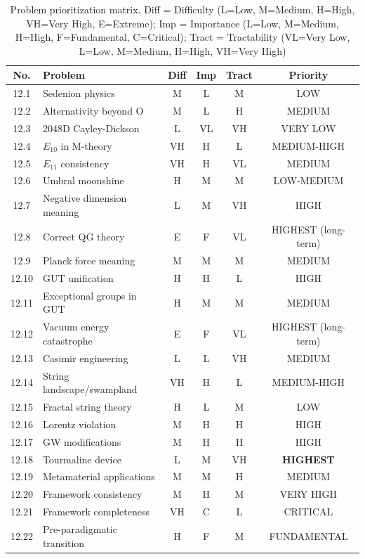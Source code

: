 \begin{table}[h]
\centering
\small
\begin{tabular}{clcccc}
\toprule
\textbf{No.} & \textbf{Problem} & \textbf{Diff} & \textbf{Imp} & \textbf{Tract} & \textbf{Priority} \\
\midrule
12.1  & Sedenion physics              & M  & L & M  & LOW \\
12.2  & Alternativity beyond O        & M  & L & H  & MEDIUM \\
12.3  & 2048D Cayley-Dickson          & L  & VL & VH & VERY LOW \\
12.4  & $E_{10}$ in M-theory          & VH & H & L  & MEDIUM-HIGH \\
12.5  & $E_{11}$ consistency          & VH & H & VL & MEDIUM \\
12.6  & Umbral moonshine              & H  & M & M  & LOW-MEDIUM \\
12.7  & Negative dimension meaning    & L  & M & VH & HIGH \\
12.8  & Correct QG theory             & E  & F & VL & HIGHEST (long-term) \\
12.9  & Planck force meaning          & M  & M & M  & MEDIUM \\
12.10 & GUT unification               & H  & H & L  & HIGH \\
12.11 & Exceptional groups in GUT     & H  & M & M  & MEDIUM \\
12.12 & Vacuum energy catastrophe     & E  & F & VL & HIGHEST (long-term) \\
12.13 & Casimir engineering           & L  & L & VH & MEDIUM \\
12.14 & String landscape/swampland    & VH & H & L  & MEDIUM-HIGH \\
12.15 & Fractal string theory         & H  & L & M  & LOW \\
12.16 & Lorentz violation             & M  & H & H  & HIGH \\
12.17 & GW modifications              & M  & H & H  & HIGH \\
12.18 & Tourmaline device             & L  & M & VH & \textbf{HIGHEST} \\
12.19 & Metamaterial applications     & M  & M & H  & MEDIUM \\
12.20 & Framework consistency         & M  & H & M  & VERY HIGH \\
12.21 & Framework completeness        & VH & C & L  & CRITICAL \\
12.22 & Pre-paradigmatic transition   & H  & F & M  & FUNDAMENTAL \\
\bottomrule
\end{tabular}
\caption{Problem prioritization matrix. Diff = Difficulty (L=Low, M=Medium, H=High, VH=Very High, E=Extreme); Imp = Importance (L=Low, M=Medium, H=High, F=Fundamental, C=Critical); Tract = Tractability (VL=Very Low, L=Low, M=Medium, H=High, VH=Very High)}
\label{tab:prioritization}
\end{table}

